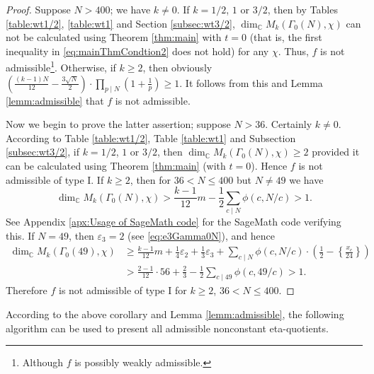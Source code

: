 \documentclass[12pt]{amsart}
\numberwithin{equation}{section}
\theoremstyle{plain}
\theoremstyle{definition}
\theoremstyle{remark}
\newcommand\numC{\mathbb{C}}
\begin{document}
\begin{proof}
Suppose $N>400$; we have $k\neq0$. If $k=1/2$, $1$ or $3/2$, then by Tables \ref{table:wt1/2}, \ref{table:wt1} and Section \ref{subsec:wt3/2}, $\dim_\numC M_k(\Gamma_0(N), \chi)$ can not be calculated using Theorem \ref{thm:main} with $t=0$ (that is, the first inequality in \eqref{eq:mainThmCondtion2} does not hold) for any $\chi$. Thus, $f$ is not admissible\footnote{Although $f$ is possibly weakly admissible.}. Otherwise, if $k\geq2$, then obviously $\left(\frac{(k-1)N}{12}-\frac{3\sqrt{N}}{2}\right)\cdot\prod_{p\mid N}\left(1+\frac{1}{p}\right)\geq1$. It follows from this and Lemma \ref{lemm:admissible} that $f$ is not admissible.

Now we begin to prove the latter assertion; suppose $N>36$. Certainly $k\neq0$. According to Table \ref{table:wt1/2}, Table \ref{table:wt1} and Subsection \ref{subsec:wt3/2}, if $k=1/2$, $1$ or $3/2$, then $\dim_\numC M_k(\Gamma_0(N),\chi)\geq2$ provided it can be calculated using Theorem \ref{thm:main} (with $t=0$). Hence $f$ is not admissible of type I. If $k\geq2$, then for $36<N\leq400$ but $N\neq 49$ we have
\begin{equation*}
\dim_\numC M_k(\Gamma_0(N), \chi)>\frac{k-1}{12}m-\frac{1}{2}\sum_{c\mid N}\phi(c,N/c)>1.
\end{equation*}
See Appendix \ref{apx:Usage of SageMath code} for the SageMath code verifying this. If $N=49$, then $\varepsilon_3=2$ (see \eqref{eq:e3Gamma0N}), and hence
\begin{align*}
\dim_\numC M_k(\Gamma_0(49), \chi)&\geq\frac{k-1}{12}m+\frac{1}{4}\varepsilon_2+\frac{1}{3}\varepsilon_3+\sum_{c\mid N}\phi(c,N/c)\cdot\left(\frac{1}{2}-\left\{\frac{x_c}{24}\right\}\right)\\
&>\frac{2-1}{12}\cdot56+\frac{2}{3}-\frac{1}{2}\sum_{c\mid 49}\phi(c,49/c)>1.
\end{align*}
Therefore $f$ is not admissible of type I for $k\geq2$, $36<N\leq400$.
\end{proof}
According to the above corollary and Lemma \ref{lemm:admissible}, the following algorithm can be used to present all admissible nonconstant eta-quotients.
\end{document}
